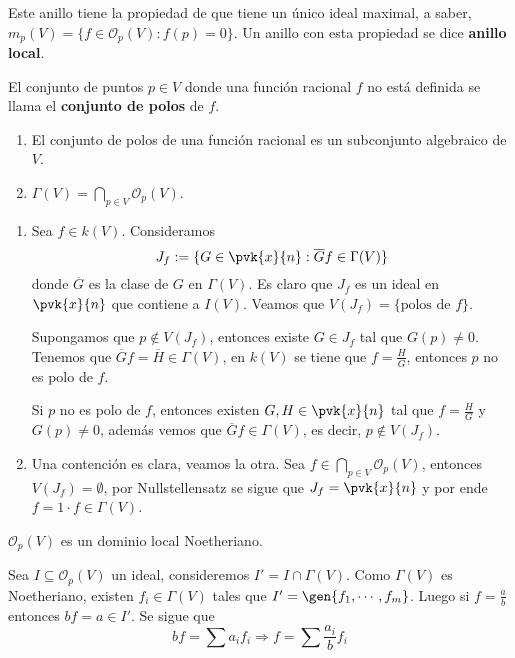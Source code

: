 \documentclass{article}
\begin{document}
\noindent Este anillo tiene la propiedad de que tiene un único ideal maximal, a saber, 
$m_{p}(V)=\{f\in\mathcal{O}_{p}(V):f(p)=0\}$. Un anillo con esta propiedad se dice 
\textbf{anillo local}.
\begin{dfn}
    El conjunto de puntos $p\in V$ donde una función racional $f$ no está definida se llama el
    \textbf{conjunto de polos} de $f$.
\end{dfn}
\begin{prop}\hspace{1mm}
    \begin{enumerate}
        \item El conjunto de polos de una función racional es un subconjunto algebraico de $V$.
        \item $\Gamma(V)=\bigcap_{p\in V}\mathcal{O}_{p}(V)$.
    \end{enumerate}
\end{prop}
\begin{dem}\hspace{1mm}
    \begin{enumerate}
        \item Sea $f\in k(V)$. Consideramos
        \begin{equation*}
            J_{f}:=\{G\in\pvk{x}{n}:\overline{G}f\in\Gamma(V)\}
        \end{equation*}
        donde $\overline{G}$ es la clase de $G$ en $\Gamma(V)$. Es claro que $J_{f}$ es un ideal
        en $\pvk{x}{n}$ que contiene a $I(V)$. Veamos que $V(J_{f})=\{\text{polos de }f\}$.

        \noindent Supongamos que $p\not\in V(J_{f})$, entonces existe $G\in J_{f}$ tal que 
        $G(p)\neq0$. Tenemos que $\overline{G}f=\overline{H}\in\Gamma(V)$, en $k(V)$ se tiene que
        $f=\frac{H}{G}$, entonces $p$ no es polo de $f$.
        
        \noindent Si $p$ no es polo de $f$, entonces existen $G,H\in\pvk{x}{n}$ tal que 
        $f=\frac{H}{G}$ y $G(p)\neq0$, además vemos que $\overline{G}f\in\Gamma(V)$, es decir, 
        $p\not\in V(J_{f})$.

        \item Una contención es clara, veamos la otra. Sea $f\in\bigcap_{p\in V}
        \mathcal{O}_{p}(V)$, entonces $V(J_{f})=\emptyset$, por Nullstellensatz se sigue que 
        $J_{f}=\pvk{x}{n}$ y por ende $f=1\cdot f\in\Gamma(V)$.
    \end{enumerate}
\end{dem}
\begin{prop}
    $\mathcal{O}_{p}(V)$ es un dominio local Noetheriano.
\end{prop}
\begin{dem}
    Sea $I\subseteq\mathcal{O}_{p}(V)$ un ideal, consideremos $I'=I\cap\Gamma(V)$. Como $\Gamma(V)$
    es Noetheriano, existen $f_{i}\in\Gamma(V)$ tales que $I'=\gen{f_{1},\cdots,f_{m}}$. Luego si
    $f=\frac{a}{b}$ entonces $bf=a\in I'$. Se sigue que
    \begin{equation*}
        bf=\sum a_{i}f_{i}\Rightarrow f=\sum\frac{a_{i}}{b}f_{i}
    \end{equation*}
\end{dem}
\end{document}
